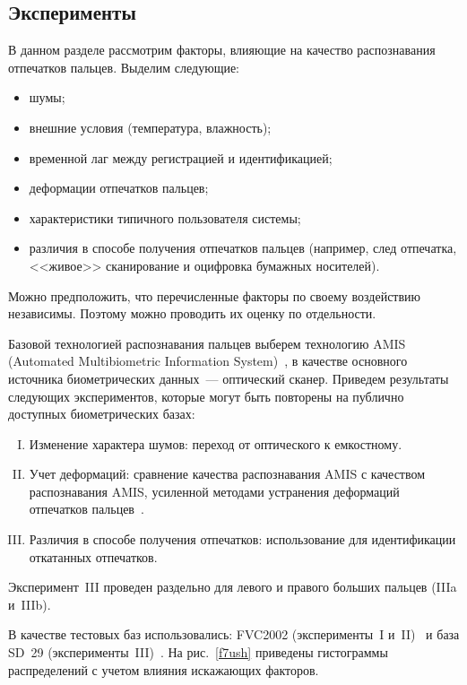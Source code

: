 \begin{multicols}{2}
\section{Эксперименты}

     В данном разделе рассмотрим факторы, влияющие на качество распознавания 
отпечатков пальцев. Выделим следующие:
     \begin{itemize}
\item шумы;
\item внешние условия (температура, влажность);
\item временной лаг между регистрацией и идентификацией;
\item деформации отпечатков пальцев;
\item характеристики типичного пользователя системы; 
\item различия в способе получения отпечатков пальцев (например, след отпечатка, 
<<живое>> сканирование и оцифровка бумажных носителей).
\end{itemize}

     Можно предположить, что перечисленные факторы по своему воздействию 
независимы. Поэтому можно проводить их оценку по отдельности.
     
     Базовой технологией распознавания пальцев выберем технологию 
AMIS (Automated Multibiometric Information System)~\cite{12ush}, в качестве основного источника биометрических данных~--- 
оптический сканер. Приведем результаты следующих экспериментов, которые могут 
быть повторены на публично доступных биометрических базах:
     \begin{enumerate}[I.]
     \item Изменение характера шумов: переход от оп\-ти\-че\-ского к емкостному.
     \item Учет деформаций: сравнение качества распознавания AMIS с качеством 
распознавания AMIS, усиленной методами устранения деформаций отпечатков 
пальцев~\cite{12ush, 13ush}.
     \item Различия в способе получения отпечатков: использование для 
идентификации откатанных отпечатков.
     \end{enumerate}
     
     Эксперимент~III проведен раздельно для левого и правого больших пальцев (IIIa 
и~IIIb). 
     
     В качестве тестовых баз использовались: FVC2002 (эксперименты~I 
и~II)~\cite{14ush} и база SD~29 (эксперименты~III)~\cite{15ush}. На рис.~\ref{f7ush} 
приведены гис\-то\-грам\-мы распределений с учетом влияния искажающих факторов.



\end{multicols}
